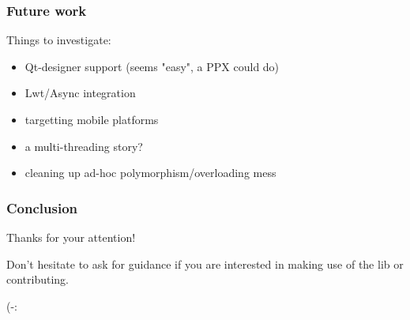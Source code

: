 \documentclass[serif,mathserif]{beamer}
\begin{document}
\begin{frame}
  \frametitle{Future work}

  Things to investigate:
  \begin{itemize}
    \item Qt-designer support (seems "easy", a PPX could do)
    \item Lwt/Async integration
    \item targetting mobile platforms 
    \item a multi-threading story?
    \item cleaning up ad-hoc polymorphism/overloading mess
  \end{itemize}
\end{frame}

\begin{frame}
  \frametitle{Conclusion}

  Thanks for your attention!
  \bigskip
  
  Don't hesitate to ask for guidance if you are interested in making use of
  the lib or contributing.
  \bigskip

  {
    \center 

    \huge (-:
  
  }

\end{frame}
\end{document}
